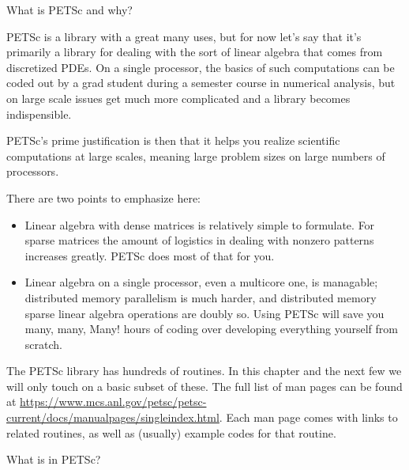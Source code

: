 
 {What is PETSc and why?}

PETSc is a library with a great many uses, but for now let's say that
it's primarily a library for dealing with the sort of linear algebra
that comes from discretized \acp{PDE}. On a single processor, the
basics of such computations 
can be coded out by a grad student during a semester
course in numerical analysis, but on large scale issues get much more
complicated and a library becomes indispensible.

PETSc's prime justification is then that it helps you realize
scientific computations at large scales, meaning large problem sizes
on large numbers of processors.

There are two points to emphasize here:
\begin{itemize}
\item Linear algebra with dense matrices is relatively simple to
  formulate. For sparse matrices the amount of logistics in dealing
  with nonzero patterns increases greatly. PETSc does most of that for
  you.
\item Linear algebra on a single processor, even a multicore one, is
  managable; distributed memory parallelism is much harder, and
  distributed memory sparse linear algebra operations are doubly
  so. Using PETSc will save you many, many, Many! hours of coding over
  developing everything yourself from scratch.
\end{itemize}

\begin{remark}
  The PETSc library has hundreds of routines. In this chapter and the
  next few we will only touch on a basic subset of these. The full
  list of man pages can be found at
  \url{https://www.mcs.anl.gov/petsc/petsc-current/docs/manualpages/singleindex.html}. Each
  man page comes with links to related routines, as well as (usually)
  example codes for that routine.
\end{remark}

 {What is in PETSc?}


